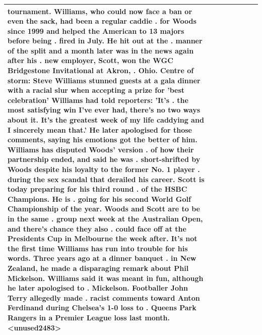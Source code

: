 \begin{table}[H]
\begin{tabular}{llrlllll}
tournament. Williams, who could now face a ban or even the sack, had been a regular caddie . for Woods since 1999 and helped the American to 13 majors before being . fired in July. He hit out at the . manner of the split and a month later was in the news again after his . new employer, Scott, won the WGC Bridgestone Invitational at Akron, . Ohio. Centre of storm: Steve Williams stunned guests at a gala dinner with a racial slur when accepting a prize for 'best celebration' Williams had told reporters: 'It's . the most satisfying win I've ever had, there's no two ways about it. It's the greatest week of my life caddying and I sincerely mean that.' He later apologised for those comments, saying his emotions got the better of him. Williams has disputed Woods' version . of how their partnership ended, and said he was . short-shrifted by Woods despite his loyalty to the former No. 1 player . during the sex scandal that derailed his career. Scott is today preparing for his third round . of the HSBC Champions. He is . going for his second World Golf Championship of the year. Woods and Scott are to be in the same . group next week at the Australian Open, and there's chance they also . could face off at the Presidents Cup in Melbourne the week after. It's not the first time Williams has run into trouble for his words. Three years ago at a dinner banquet . in New Zealand, he made a disparaging remark about Phil Mickelson. Williams said it was meant in fun, although he later apologised to . Mickelson. Footballer John Terry allegedly made . racist comments toward Anton Ferdinand during Chelsea's 1-0 loss to . Queens Park Rangers in a Premier League loss last month.<unused2483> \\
\bottomrule
\end{tabular}
\end{table}
